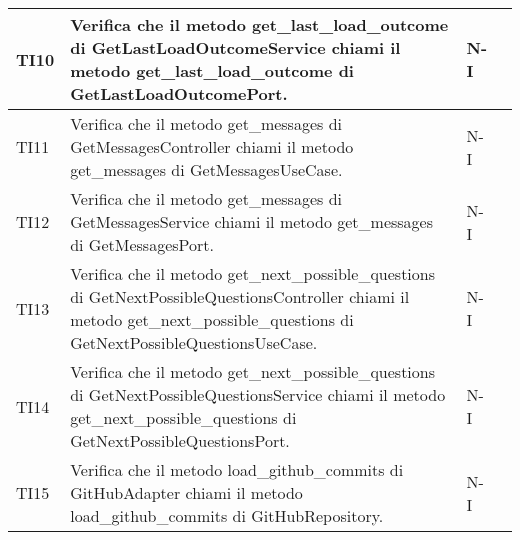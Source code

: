 \begin{table}[h!]
\begin{tabularx}{\textwidth}{|p{}|X|p{}|p{}|}
    TI10 & Verifica che il metodo get\_last\_load\_outcome di GetLastLoadOutcomeService chiami il metodo get\_last\_load\_outcome di GetLastLoadOutcomePort. &  N-I \\ \hline
    TI11 & Verifica che il metodo get\_messages di GetMessagesController chiami il metodo get\_messages di GetMessagesUseCase. &  N-I \\ \hline
    TI12 & Verifica che il metodo get\_messages di GetMessagesService chiami il metodo get\_messages di GetMessagesPort. &  N-I \\ \hline
    TI13 & Verifica che il metodo get\_next\_possible\_questions di GetNextPossibleQuestionsController chiami il metodo get\_next\_possible\_questions di GetNextPossibleQuestionsUseCase. &  N-I \\ \hline
    TI14 & Verifica che il metodo get\_next\_possible\_questions di GetNextPossibleQuestionsService chiami il metodo get\_next\_possible\_questions di GetNextPossibleQuestionsPort. &  N-I \\ \hline
    TI15 & Verifica che il metodo load\_github\_commits di GitHubAdapter chiami il metodo load\_github\_commits di GitHubRepository. &  N-I \\ \hline
    \end{tabularx}
\end{table}

\newpage

